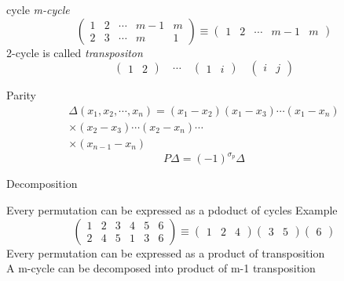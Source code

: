 \documentclass[11pt]{beamer}
\begin{document}
\begin{frame}{cycle}
	\textit{m-cycle}   
	\begin{equation}
		\begin{pmatrix}
			1&2&\cdots & m-1 &m \\
			2&3&\cdots &m &1 
		\end{pmatrix}\equiv 
			\begin{pmatrix}
			1&2&\cdots & m-1 &m 
		\end{pmatrix}
	\end{equation}
	2-cycle is called \textit{transpositon}
	\begin{equation}
		\begin{pmatrix}
			1 &2 
		\end{pmatrix} \quad \cdots \quad 	\begin{pmatrix}
		1 &i
		\end{pmatrix} \quad \begin{pmatrix}
		i &j
		\end{pmatrix}
	\end{equation}
\end{frame}
	\begin{frame}{Parity}
		\begin{equation}
		\begin{split}
		\Delta(x_1,x_2,\cdots,x_n)=(x_1-x_2)(x_1-x_3)\cdots(x_1-x_n)\\
		\times(x_2-x_3)\cdots(x_2-x_n) \cdots \\
		\times(x_{n-1}-x_n)
	\end{split}		
		\end{equation}
\begin{equation}
	P \Delta=(-1)^{\sigma_p}\Delta
\end{equation}
\end{frame}
\begin{frame}{Decomposition}

		Every permutation can be expressed as a pdoduct of cycles 
	Example
	\begin{equation}
		\begin{pmatrix}
			1 &2&3&4&5&6\\
			2&4&5&1&3&6
		\end{pmatrix}\equiv \begin{pmatrix}
		1 &2&4 
		\end{pmatrix} \begin{pmatrix}
	3 &5 
		\end{pmatrix}
		\begin{pmatrix}
			6
		\end{pmatrix}
	\end{equation}
	Every permutation can be expressed as a product of transposition \\
	A m-cycle can be decomposed into product of m-1 transposition
\end{frame}
\end{document}
